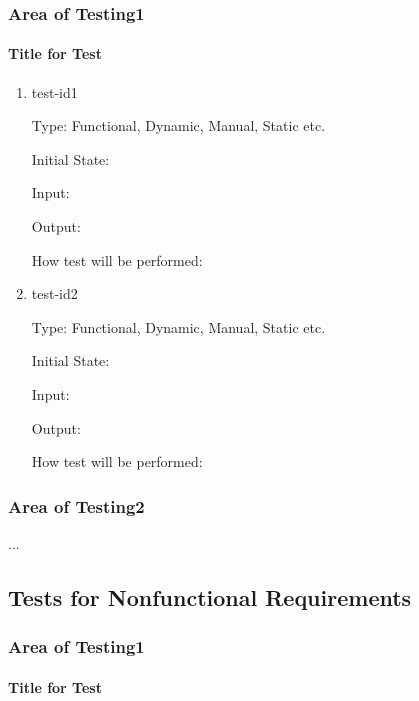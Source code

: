\documentclass[12pt, titlepage]{article}
\begin{document}
\subsubsection{Area of Testing1}
		
\paragraph{Title for Test}

\begin{enumerate}

\item{test-id1\\}

Type: Functional, Dynamic, Manual, Static etc.
					
Initial State: 
					
Input: 
					
Output: 
					
How test will be performed: 
					
\item{test-id2\\}

Type: Functional, Dynamic, Manual, Static etc.
					
Initial State: 
					
Input: 
					
Output: 
					
How test will be performed: 

\end{enumerate}

\subsubsection{Area of Testing2}

...

\subsection{Tests for Nonfunctional Requirements}

\subsubsection{Area of Testing1}
		
\paragraph{Title for Test}
\end{document}

